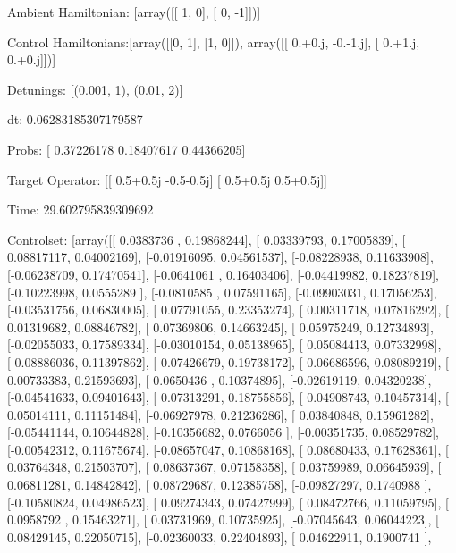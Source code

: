 \documentclass{article}
\begin{document}
    

\newpage

Ambient Hamiltonian: [array([[ 1,  0],
       [ 0, -1]])]

Control Hamiltonians:[array([[0, 1],
       [1, 0]]), array([[ 0.+0.j, -0.-1.j],
       [ 0.+1.j,  0.+0.j]])]

Detunings: [(0.001, 1), (0.01, 2)]

 dt: 0.06283185307179587

Probs: [ 0.37226178  0.18407617  0.44366205]

Target Operator: [[ 0.5+0.5j -0.5-0.5j]
 [ 0.5+0.5j  0.5+0.5j]]

Time: 29.602795839309692

Controlset: [array([[ 0.0383736 ,  0.19868244],
       [ 0.03339793,  0.17005839],
       [ 0.08817117,  0.04002169],
       [-0.01916095,  0.04561537],
       [-0.08228938,  0.11633908],
       [-0.06238709,  0.17470541],
       [-0.0641061 ,  0.16403406],
       [-0.04419982,  0.18237819],
       [-0.10223998,  0.0555289 ],
       [-0.0810585 ,  0.07591165],
       [-0.09903031,  0.17056253],
       [-0.03531756,  0.06830005],
       [ 0.07791055,  0.23353274],
       [ 0.00311718,  0.07816292],
       [ 0.01319682,  0.08846782],
       [ 0.07369806,  0.14663245],
       [ 0.05975249,  0.12734893],
       [-0.02055033,  0.17589334],
       [-0.03010154,  0.05138965],
       [ 0.05084413,  0.07332998],
       [-0.08886036,  0.11397862],
       [-0.07426679,  0.19738172],
       [-0.06686596,  0.08089219],
       [ 0.00733383,  0.21593693],
       [ 0.0650436 ,  0.10374895],
       [-0.02619119,  0.04320238],
       [-0.04541633,  0.09401643],
       [ 0.07313291,  0.18755856],
       [ 0.04908743,  0.10457314],
       [ 0.05014111,  0.11151484],
       [-0.06927978,  0.21236286],
       [ 0.03840848,  0.15961282],
       [-0.05441144,  0.10644828],
       [-0.10356682,  0.0766056 ],
       [-0.00351735,  0.08529782],
       [-0.00542312,  0.11675674],
       [-0.08657047,  0.10868168],
       [ 0.08680433,  0.17628361],
       [ 0.03764348,  0.21503707],
       [ 0.08637367,  0.07158358],
       [ 0.03759989,  0.06645939],
       [ 0.06811281,  0.14842842],
       [ 0.08729687,  0.12385758],
       [-0.09827297,  0.1740988 ],
       [-0.10580824,  0.04986523],
       [ 0.09274343,  0.07427999],
       [ 0.08472766,  0.11059795],
       [ 0.0958792 ,  0.15463271],
       [ 0.03731969,  0.10735925],
       [-0.07045643,  0.06044223],
       [ 0.08429145,  0.22050715],
       [-0.02360033,  0.22404893],
       [ 0.04622911,  0.1900741 ],
\end{document}

